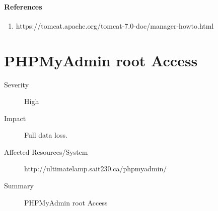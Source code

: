 \documentclass{article}
\begin{document}
\paragraph{References}

\begin{enumerate}
  \item https://tomcat.apache.org/tomcat-7.0-doc/manager-howto.html
\end{enumerate}


\newpage
\section{PHPMyAdmin root Access}

\begin{description}
  \item[Severity] High
  \item[Impact] Full data loss.
  \item[Affected Resources/System] http://ultimatelamp.sait230.ca/phpmyadmin/
  \item[Summary] PHPMyAdmin root Access
\end{description}
\end{document}
